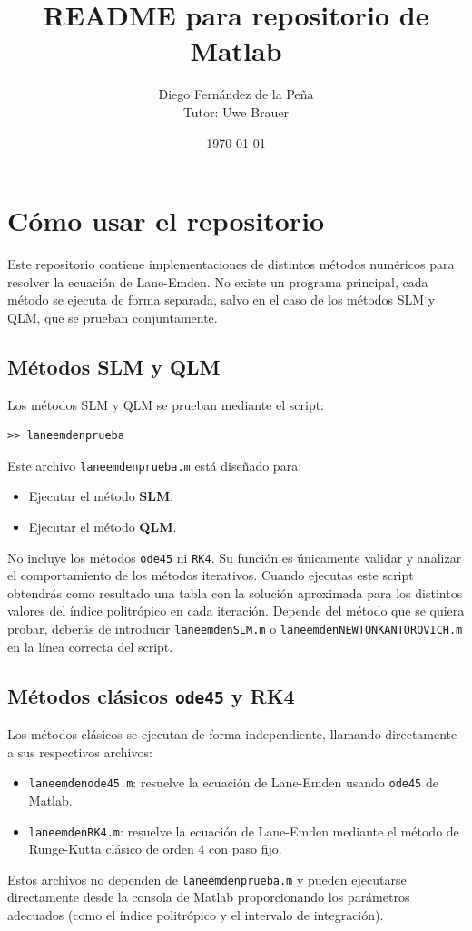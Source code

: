 \documentclass{article}
\title{README para repositorio de Matlab}
\author{Diego Fernández de la Peña \\
Tutor: Uwe Brauer
}
\date{\today}
\begin{document}
\maketitle
\listoftodos
\section{Cómo usar el repositorio}

Este repositorio contiene implementaciones de distintos métodos numéricos 
para resolver la ecuación de Lane-Emden. No existe un programa principal, 
cada método se ejecuta de forma separada, salvo en el caso de los métodos 
SLM y QLM, que se prueban conjuntamente.

\subsection{Métodos SLM y QLM}

Los métodos SLM y QLM se prueban mediante el script:
\begin{verbatim}
>> laneemdenprueba
\end{verbatim}
Este archivo \texttt{laneemdenprueba.m} está diseñado para:
\begin{itemize}
  \item Ejecutar el método \textbf{SLM}.
  \item Ejecutar el método \textbf{QLM}.
\end{itemize}
No incluye los métodos \texttt{ode45} ni \texttt{RK4}. 
Su función es únicamente validar y analizar el comportamiento de 
los métodos iterativos. Cuando ejecutas este script obtendrás 
como resultado una tabla con la solución aproximada para los 
distintos valores del índice politrópico en cada iteración.
Depende del método que se quiera probar, deberás de introducir
\texttt{laneemdenSLM.m} o \texttt{laneemdenNEWTONKANTOROVICH.m}
en la línea correcta del script.

\subsection{Métodos clásicos \texttt{ode45} y RK4}

Los métodos clásicos se ejecutan de forma independiente, llamando 
directamente a sus respectivos archivos:
\begin{itemize}
  \item \texttt{laneemdenode45.m}: resuelve la ecuación de Lane-Emden usando 
  \texttt{ode45} de Matlab.
  \item \texttt{laneemdenRK4.m}: resuelve la ecuación de Lane-Emden mediante 
  el método de Runge-Kutta clásico de orden 4 con paso fijo.
\end{itemize}
Estos archivos no dependen de \texttt{laneemdenprueba.m} y pueden 
ejecutarse directamente desde la consola de Matlab proporcionando 
los parámetros adecuados (como el índice politrópico y el intervalo 
de integración).
\end{document}
